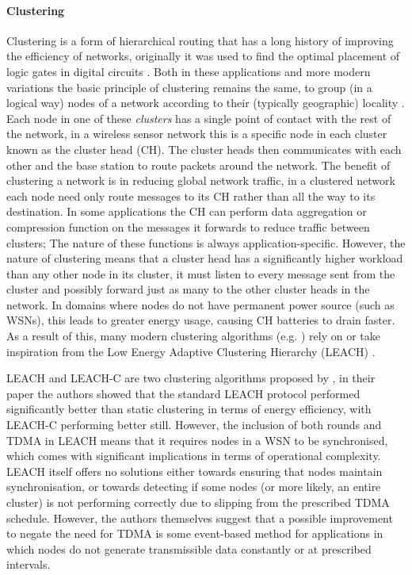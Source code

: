\paragraph{Clustering} Clustering is a form of hierarchical routing that has a long history of improving the efficiency of networks, originally it was used to find the optimal placement of logic gates in digital circuits \cite{clustering}. Both in these applications and more modern variations the basic principle of clustering remains the same, to group (in a logical way) nodes of a network according to their (typically geographic) locality \cite{1628365}. Each node in one of these \emph{clusters} has a single point of contact with the rest of the network, in a wireless sensor network this is a specific node in each cluster known as the cluster head (CH). The cluster heads then communicates with each other and the base station to route packets around the network. The benefit of clustering a network is in reducing global network traffic, in a clustered network each node need only route messages to its CH rather than all the way to its destination. In some applications the CH can perform data aggregation or compression function\cite{1285913, aggregation} on the messages it forwards to reduce traffic between clusters; The nature of these functions is always application-specific. However, the nature of clustering means that a cluster head has a significantly higher workload than any other node in its cluster, it must listen to every message sent from the cluster and possibly forward just as many to the other cluster heads in the network. In domains where nodes do not have permanent power source (such as WSNs), this leads to greater energy usage, causing CH batteries to drain faster\cite{placement}. As a result of this, many modern clustering algorithms (e.g. \cite{eemc, secc}) rely on or take inspiration from the Low Energy Adaptive Clustering Hierarchy (LEACH) \cite{LEACH}.

LEACH and LEACH-C are two clustering algorithms proposed by \citeauthor{LEACH}, in their paper the authors showed that the standard LEACH protocol performed significantly better than static clustering in terms of energy efficiency, with LEACH-C performing better still. However, the inclusion of both rounds and TDMA in LEACH means that it requires nodes in a WSN to be synchronised, which comes with significant implications in terms of operational complexity. LEACH itself offers no solutions either towards ensuring that nodes maintain synchronisation, or towards detecting if some nodes (or more likely, an entire cluster) is not performing correctly due to slipping from the prescribed TDMA schedule. However, the authors themselves suggest that a possible improvement to negate the need for TDMA is some event-based method for applications in which nodes do not generate transmissible data constantly or at prescribed intervals.

